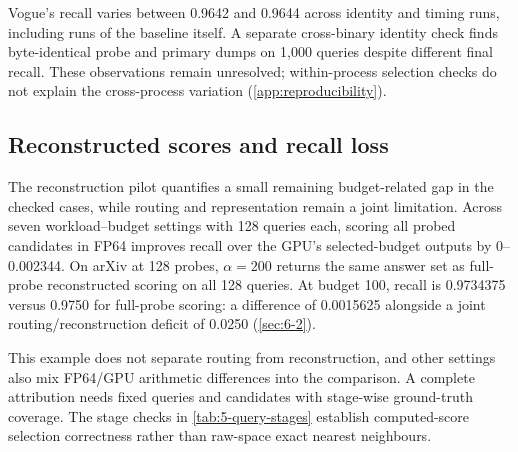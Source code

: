 Vogue's recall varies between 0.9642 and 0.9644 across identity and
timing runs, including runs of the baseline itself. A separate
cross-binary identity check finds byte-identical probe and primary dumps
on 1,000 queries despite different final recall. These observations
remain unresolved; within-process selection checks do not explain the
cross-process variation (\cref{app:reproducibility}).

\subsection{Reconstructed scores and recall loss}
\label{sec:7-recall-attribution}

The reconstruction pilot quantifies a small remaining budget-related
gap in the checked cases, while routing and representation remain a
joint limitation. Across seven workload--budget settings with 128 queries
each, scoring all probed candidates in FP64 improves recall over the
GPU's selected-budget outputs by 0--0.002344. On arXiv at 128 probes,
$\alpha=200$ returns the same answer set as full-probe reconstructed
scoring on all 128 queries. At budget 100, recall is 0.9734375 versus
0.9750 for full-probe scoring: a difference of 0.0015625 alongside a
joint routing/reconstruction deficit of 0.0250 (\cref{sec:6-2}).

This example does not separate routing from reconstruction, and other
settings also mix FP64/GPU arithmetic differences into the comparison.
A complete attribution needs fixed queries and candidates with
stage-wise ground-truth coverage. The stage checks in
\cref{tab:5-query-stages} establish computed-score selection correctness
rather than raw-space exact nearest neighbours.
